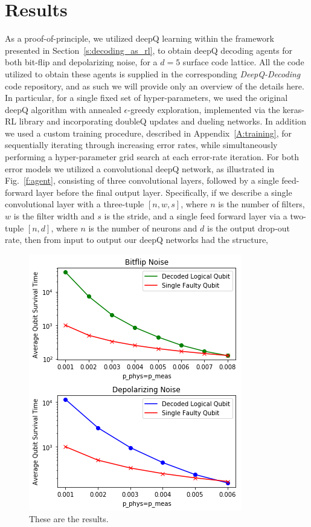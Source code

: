 \documentclass[twocolumn,preprintnumbers,amsmath,amssymb,notitlepage,nofootinbib,longbibliography,superscriptaddress,aps,pra,10pt]{revtex4-1}
\begin{document}
\section{Results}\label{s:results}

	As a proof-of-principle, we utilized deepQ learning within the framework presented in Section~\ref{s:decoding_as_rl}, to obtain deepQ decoding agents for both bit-flip and depolarizing noise, for a $d=5$ surface code lattice.
	All the code utilized to obtain these agents is supplied in the corresponding \textit{DeepQ-Decoding} code repository, and as such we will provide only an overview of the details here.
	In particular, for a single fixed set of hyper-parameters, we used the original deepQ algorithm with annealed $\epsilon$-greedy exploration, implemented via the keras-RL library and incorporating doubleQ updates and dueling networks.
	In addition we used a custom training procedure, described in Appendix~\ref{A:training}, for sequentially iterating through increasing error rates, while simultaneously performing a hyper-parameter grid search at each error-rate iteration.
	For both error models we utilized a convolutional deepQ network, as illustrated in Fig.~\ref{f:agent}, consisting of three convolutional layers, followed by a single feed-forward layer before the final output layer.
	Specifically, if we describe a single convolutional layer with a three-tuple $[n,w,s]$, where $n$ is the number of filters, $w$ is the filter width and $s$ is the stride, and a single feed forward layer via a two-tuple $[n,d]$, where $n$ is the number of neurons and $d$ is the output drop-out rate, then from input to output our deepQ networks had the structure,

	\begin{figure}
		\centering
		\includegraphics[width=0.8\linewidth]{figures/results.png}
		\caption{
			These are the results.
		}
		\label{f:results}
	\end{figure}
\end{document}
